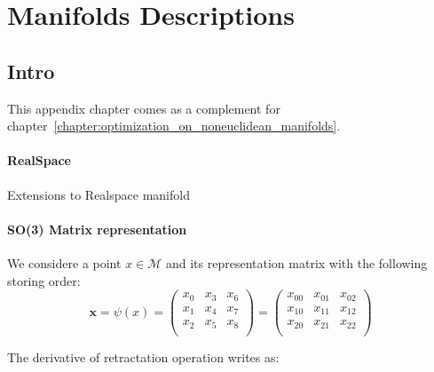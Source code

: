 

\chapter{Manifolds Descriptions}
\label{appendix:manifolds}

\graphicspath{{Appendix2-Manifolds/Figs/}}

\section{Intro}
This appendix chapter comes as a complement for chapter~\ref{chapter:optimization_on_noneuclidean_manifolds}.

\subsubsection{RealSpace}
\label{ssub:RealSpace}

Extensions to Realspace manifold

\subsubsection{SO(3) Matrix representation}
\label{ssub:so(3)_matrix_representation}

We considere a point $x\in\mathcal{M}$ and its representation matrix with the following storing order:
\begin{equation}
\mathbf{x}=\psi(x)
= \begin{pmatrix}
  x_0 & x_3 & x_6 \\
  x_1 & x_4 & x_7 \\
  x_2 & x_5 & x_8 \\
\end{pmatrix}
= \begin{pmatrix}
  x_{00} & x_{01} & x_{02} \\
  x_{10} & x_{11} & x_{12} \\
  x_{20} & x_{21} & x_{22} \\
\end{pmatrix}
\end{equation}

The derivative of retractation operation writes as:

